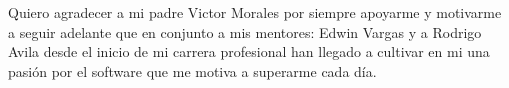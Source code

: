 \linespread{1.25}
\thispagestyle{empty}
\noindent
Quiero agradecer a mi padre Victor Morales por siempre apoyarme y motivarme a seguir adelante que en conjunto a mis mentores: Edwin Vargas y a Rodrigo Avila desde el inicio de mi carrera profesional han llegado a cultivar en mi una pasión por el software que me motiva a superarme cada día.
\mbox{}
\vfill
\newpage